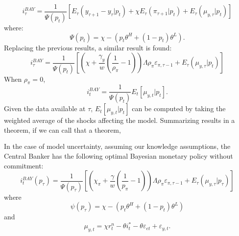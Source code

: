 \documentclass{beamer}
\begin{document}
\begin{frame}
\begin{equation}
i_\tau^{BAY} = \frac{1}{\Psi(p_t)} [E_\tau (y_{\tau+1} - y_\tau|p_t) + \chi E_\tau (\pi_{\tau+1}|p_t) + E_\tau (\mu_{y,\tau}|p_t)]
\end{equation}
where:
\begin{equation}
\Psi (p_t) = \chi - (p_t \theta^H + (1-p_t) \theta^L).
\end{equation}
Replacing the previous results, a similar result is found:
\begin{equation}
i_\tau^{BAY} = \frac{1}{\Psi(p_t)} \left [ \left ( \chi + \frac{\gamma_y}{w} ( \frac{1}{\rho_\pi} - 1) \right ) \Lambda \rho_\pi \varepsilon_{\pi,\tau-1} + E_\tau (\mu_{y,\tau}|p_t) \right ]
\end{equation}
When $\rho_\pi = 0$, 
\begin{equation}
i_t^{BAY} = \frac{1}{\Psi(p_t)} E_t[\mu_{y,t}|p_t].
\end{equation}
Given the data available at $\tau$, $E_t[\mu_{y,t}|p_t]$ can be computed by
taking the weighted average of the shocks affecting the model. Summarizing
results in a theorem, if we can call that a theorem,
\end{frame}

\begin{frame}
\begin{theorem}
 In the case of model uncertainty, assuming our knowledge assumptions, the
 Central Banker has the following optimal Bayesian monetary policy without
 commitment:
\begin{equation}
i_t^{BAY} (p_\tau) = \frac{1}{\Psi (p_\tau)} \left [ \left ( \chi_\pi + \frac{\gamma}{w} (\frac{1}{p_\pi} - 1 ) \right ) \Lambda \rho_\pi \varepsilon_{\pi,\tau-1} + E_\tau (\mu_{y,\tau}|p_\tau) \right ]
\end{equation}
where
\begin{equation}
\psi(p_\tau) = \chi - \left (p_t \theta^H + (1-p_t) \theta^L \right )
\end{equation}
and
\begin{equation}
\mu_{y,t} = \chi r_t^n - \theta i_t^* - \theta \varepsilon_{et} +
\varepsilon_{y,t}.
\end{equation}
\end{theorem}
\end{frame}
\end{document}
